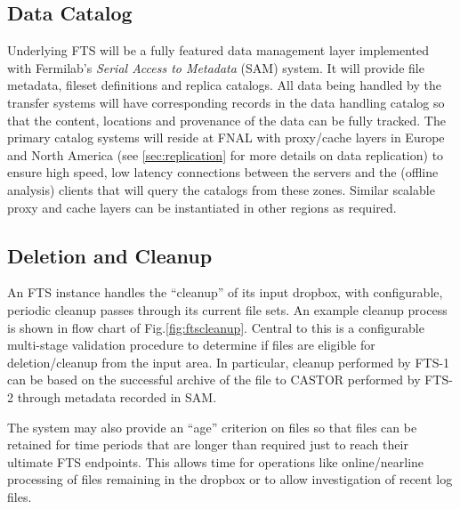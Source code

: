\documentclass[12pt]{article}
\begin{document}
{\subsection{Data Catalog}
\label{sec:sam}

Underlying FTS will be a fully featured data management layer
implemented with Fermilab's \textit{Serial Access to Metadata} (SAM) system.
It will provide file metadata, fileset definitions and replica
catalogs.  All data being handled by the transfer systems will have
corresponding records in the data handling catalog so that the
content, locations and provenance of the data can be fully tracked.
The primary catalog systems will reside at FNAL with proxy/cache
layers in Europe and North America (see \ref{sec:replication}
for more details on data replication) to ensure high speed,
low latency connections between the servers and the (offline analysis)
clients that will query the catalogs from these zones.  Similar
scalable proxy and cache layers can be instantiated in other regions as required.

\subsection{Deletion and Cleanup}
\label{sec:cleanup}

An FTS instance handles the ``cleanup'' of its input dropbox, with
configurable, periodic cleanup passes through its current file sets.
An example cleanup process is shown in flow chart of
Fig.\ref{fig:ftscleanup}.  Central to this is a configurable
multi-stage validation procedure to determine if files are eligible
for deletion/cleanup from the input area.  In particular, cleanup
performed by FTS-1 can be based on the successful archive of the file
to CASTOR performed by FTS-2 through metadata recorded in SAM.

The system may also provide an ``age'' criterion on files so that
files can be retained for time periods that are longer than required
just to reach their ultimate FTS endpoints.  This allows time for
operations like online/nearline processing of files remaining in the
dropbox or to allow investigation of recent log files.


}
\end{document}
